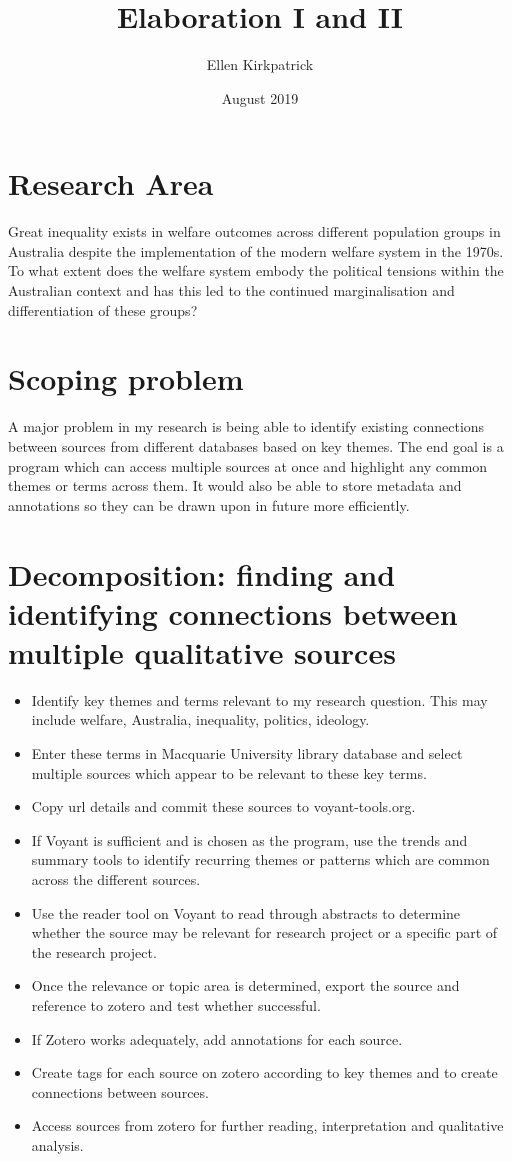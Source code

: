 \documentclass{article}
\title{Elaboration I and II}
\author{Ellen Kirkpatrick }
\date{August 2019}
\begin{document}
\maketitle
\section{Research Area}
Great inequality exists in welfare outcomes across different population groups in Australia despite the implementation of the modern welfare system in the 1970s. To what extent does the welfare system embody the political tensions within the Australian context and has this led to the continued marginalisation and differentiation of these groups?

\section{Scoping problem}
A major problem in my research is being able to identify existing connections between sources from different databases based on key themes. The end goal is a program which can access multiple sources at once and highlight any common themes or terms across them. It would also be able to store metadata and annotations so they can be drawn upon in future more efficiently.

\section{Decomposition: finding and identifying connections between multiple qualitative sources}
\begin{itemize}
    \item Identify key themes and terms relevant to my research question. This may include welfare, Australia, inequality, politics, ideology.
    \item Enter these terms in Macquarie University library database and select multiple sources which appear to be relevant to these key terms. 
    \item Copy url details and commit these sources to  voyant-tools.org. 
    \item If Voyant is sufficient and is chosen as the program, use the trends and summary tools to identify recurring themes or patterns which are common across the different sources. 
    \item Use the reader tool on Voyant to read through abstracts to determine whether the source may be relevant for research project or a specific part of the research project.
    \item Once the relevance or topic area is determined, export the source and reference to zotero and test whether successful. 
    \item If Zotero works adequately, add annotations for each source.
    \item Create tags for each source on zotero according to key themes and to create connections between sources.
    \item Access sources from zotero for further reading, interpretation and qualitative analysis. 
\end{itemize}
\end{document}
